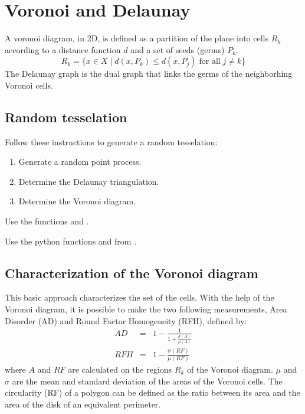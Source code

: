\section{Voronoi and Delaunay}%
A voronoi diagram, in 2D, is defined as a partition of the plane into cells $R_k$ according to a distance function $d$ and a set of seeds 
(germs) $P_k$. 
$$R_k = \{x \in X \mid d(x, P_k) \leq d(x, P_j)\; \text{for all}\; j \neq k\}$$
The Delaunay graph is the dual graph that links the germs of the neighborhing Voronoi cells.

\subsection{Random tesselation}
Follow these instructions to generate a random tesselation:
\begin{qbox}
\begin{enumerate}
	\item Generate a random point process.
	\item Determine the Delaunay triangulation.
	\item Determine the Voronoi diagram.
\end{enumerate}
\end{qbox}

\begin{mcomment}
\begin{mremark} Use the \matlabregistered{} functions  and .
\end{mremark}
\end{mcomment}

\begin{pcomment}
\begin{premark}
 Use the python functions  and  from .
\end{premark}
\end{pcomment}


\subsection{Characterization of the Voronoi diagram}
This basic approach characterizes the set of the cells. With the help of the Voronoi diagram, it is possible to make the two following measurements,
Area Disorder (AD) and Round Factor Homogeneity (RFH), defined by:
	\begin{eqnarray}
	AD&=&1-\frac{1}{1+\displaystyle\frac{\sigma(A)}{\mu(A)}}\\
	RFH&=&1-\frac{\sigma(RF)}{\mu(RF)}
	\end{eqnarray}
	where $A$ and $RF$ are calculated on the regions $R_k$ of the Voronoi diagram.  $\mu$ and $\sigma$ are the mean and standard 
deviation of the areas of the Voronoi cells. The circularity (RF) of a polygon can be defined as the ratio between its area and the area of the disk of an equivalent perimeter.


